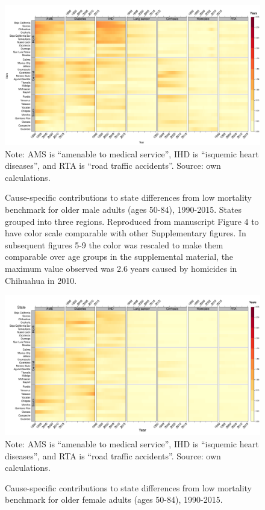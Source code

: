 \documentclass[11.5pt]{article}
\begin{document}
{\begin{figure}[h!]
\centering
\caption{Cause-specific contributions to state differences from low mortality benchmark for older male adults (ages 50-84), 1990-2015. States grouped into three regions. Reproduced from manuscript Figure 4 to have color scale comparable with other Supplementary figures. In subsequent figures 5-9 the color was rescaled to make them comparable over age groups in the supplemental material, the maximum value observed was 2.6 years caused by homicides in Chihuahua in 2010.}
\label{fig:e40_74_males}
\includegraphics[scale=.30]{Adult_Male_heatmap.pdf}
Note: AMS is ``amenable to medical service'', IHD is ``isquemic heart diseases'', and RTA is ``road traffic accidents''. Source: own calculations. \end{figure}

\begin{figure}[h!]
\centering
\caption{Cause-specific contributions to state differences from low mortality benchmark for older female adults (ages 50-84), 1990-2015.}
\label{fig:e40_74_females}
\includegraphics[scale=.30]{Adult_Female_heatmap.pdf}
Note: AMS is ``amenable to medical service'', IHD is ``isquemic heart diseases'', and RTA is ``road traffic accidents''. Source: own calculations. \end{figure}


}
\end{document}

